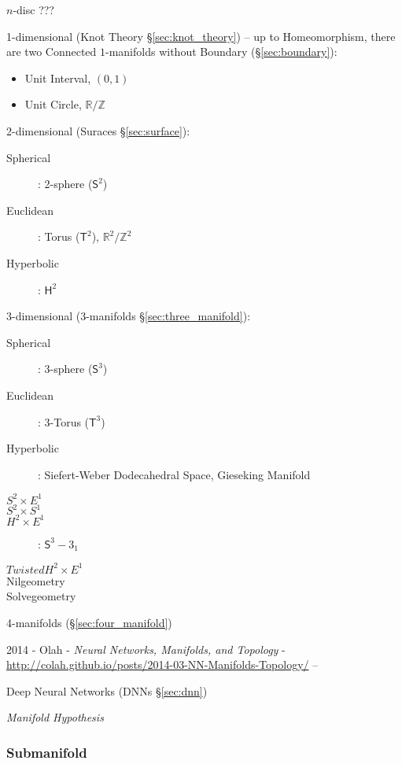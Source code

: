 $n$-disc ??? %

1-dimensional (Knot Theory \S\ref{sec:knot_theory}) -- up to Homeomorphism,
there are two Connected $1$-manifolds without Boundary (\S\ref{sec:boundary}):

\begin{itemize}
  \item Unit Interval, $(0,1)$
  \item Unit Circle, $\mathbb{R}/\mathbb{Z}$
\end{itemize}

2-dimensional (Suraces \S\ref{sec:surface}):

\begin{description}
  \item [Spherical]: 2-sphere ($\mathsf{S}^2$)
  \item [Euclidean]: Torus ($\mathsf{T}^2$),
  $\mathbb{R}^2/\mathbb{Z}^2$
  \item [Hyperbolic]: $\mathsf{H}^2$
\end{description}

3-dimensional (3-manifolds \S\ref{sec:three_manifold}):

\begin{description}
  \item [Spherical]: 3-sphere ($\mathsf{S}^3$)
  \item [Euclidean]: 3-Torus ($\mathsf{T}^3$)
  \item [Hyperbolic]: Siefert-Weber Dodecahedral Space, Gieseking
  Manifold
  \item [$S^2 \times E^1$]
  \item [$S^2 \times S^1$]
  \item [$H^2 \times E^1$]: $\mathsf{S}^3 - 3_1$
  \item [$Twisted H^2 \times E^1$]
  \item [Nilgeometry]
  \item [Solvegeometry]
\end{description}

4-manifolds (\S\ref{sec:four_manifold})

\asterism

2014 - Olah - \emph{Neural Networks, Manifolds, and Topology} -
\url{http://colah.github.io/posts/2014-03-NN-Manifolds-Topology/} --

Deep Neural Networks (DNNs \S\ref{sec:dnn})

\emph{Manifold Hypothesis}



\subsubsection{Submanifold}\label{sec:submanifold}


